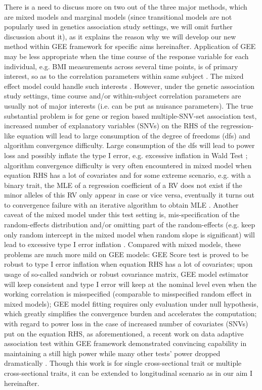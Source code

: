 \documentclass[12pt]{article}
\begin{document}
There is a need to discuss more on two out of the three major methods, which are mixed models and marginal models (since transitional models are not popularly used in genetics association study settings, we will omit further discussion about it), as it explains the reason why we will develop our new method within GEE framework for specific aims hereinafter. Application of GEE may be less appropriate when the time course of the response variable for each individual, e.g. BMI measurements across several time points, is of primary interest, so as to the correlation parameters within same subject \cite{zeger1988models,liang1986longitudinal}. The mixed effect model could handle such interests \cite{laird1982random}. However, under the genetic association study settings, time course and/or within-subject correlation parameters are usually not of major interests (i.e. can be put as nuisance parameters). The true substantial problem is for gene or region based multiple-SNV-set association test, increased number of explanatory variables (SNVs) on the RHS of the regression-like equation will lead to large consumption of the degree of freedoms (dfs) and algorithm convergence difficulty. Large consumption of the dfs will lead to power loss and possibly inflate the type I error, e.g. excessive inflation in Wald Test \cite{guo2005small,pan2001robust,shete2004effect}; algorithm convergence difficulty is very often encountered in mixed model when equation RHS has a lot of covariates and for some extreme scenario, e.g. with a binary trait, the MLE of a regression coefficient of a RV does not exist if the minor alleles of this RV only appear in case or vice versa, eventually it turns out to convergence failure with an iterative algorithm to obtain MLE \cite{zhang2014testing,pan2014powerful}. Another caveat of the mixed model under this test setting is, mis-specification of the random-effects distribution and/or omitting part of the random-effects (e.g. keep only random intercept in the mixed model when random slope is significant) will lead to excessive type I error inflation \cite{litiere2007type,Xu2014}. Compared with mixed models, these problems are much more mild on GEE models: GEE Score test is proved to be robust to type I error inflation when equation RHS has a lot of covariates; upon usage of so-called sandwich or robust covariance matrix, GEE model estimator will keep consistent and type I error will keep at the nominal level even when the working correlation is misspecified (comparable to misspecified random effect in mixed models); GEE model fitting requires only evaluation under null hypothesis, which greatly simplifies the convergence burden and accelerates the computation; with regard to power loss in the case of increased number of covariates (SNVs) put on the equation RHS, as aforementioned, a recent work on data adaptive association test within GEE framework demonstrated convincing capability in maintaining a still high power while many other tests' power dropped dramatically \cite{zhang2014testing,pan2014powerful}. Though this work is for single cross-sectional trait or multiple cross-sectional traits, it can be extended to longitudinal scenario as in our aim I hereinafter. 
\end{document}
